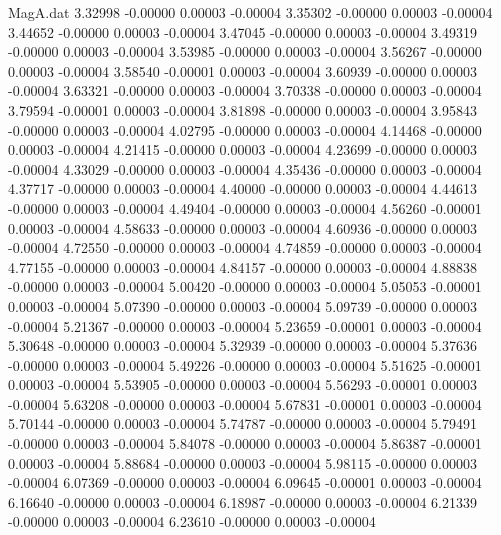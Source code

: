 \begin{filecontents}{MagA.dat}
   3.32998   -0.00000    0.00003   -0.00004
   3.35302   -0.00000    0.00003   -0.00004
   3.44652   -0.00000    0.00003   -0.00004
   3.47045   -0.00000    0.00003   -0.00004
   3.49319   -0.00000    0.00003   -0.00004
   3.53985   -0.00000    0.00003   -0.00004
   3.56267   -0.00000    0.00003   -0.00004
   3.58540   -0.00001    0.00003   -0.00004
   3.60939   -0.00000    0.00003   -0.00004
   3.63321   -0.00000    0.00003   -0.00004
   3.70338   -0.00000    0.00003   -0.00004
   3.79594   -0.00001    0.00003   -0.00004
   3.81898   -0.00000    0.00003   -0.00004
   3.95843   -0.00000    0.00003   -0.00004
   4.02795   -0.00000    0.00003   -0.00004
   4.14468   -0.00000    0.00003   -0.00004
   4.21415   -0.00000    0.00003   -0.00004
   4.23699   -0.00000    0.00003   -0.00004
   4.33029   -0.00000    0.00003   -0.00004
   4.35436   -0.00000    0.00003   -0.00004
   4.37717   -0.00000    0.00003   -0.00004
   4.40000   -0.00000    0.00003   -0.00004
   4.44613   -0.00000    0.00003   -0.00004
   4.49404   -0.00000    0.00003   -0.00004
   4.56260   -0.00001    0.00003   -0.00004
   4.58633   -0.00000    0.00003   -0.00004
   4.60936   -0.00000    0.00003   -0.00004
   4.72550   -0.00000    0.00003   -0.00004
   4.74859   -0.00000    0.00003   -0.00004
   4.77155   -0.00000    0.00003   -0.00004
   4.84157   -0.00000    0.00003   -0.00004
   4.88838   -0.00000    0.00003   -0.00004
   5.00420   -0.00000    0.00003   -0.00004
   5.05053   -0.00001    0.00003   -0.00004
   5.07390   -0.00000    0.00003   -0.00004
   5.09739   -0.00000    0.00003   -0.00004
   5.21367   -0.00000    0.00003   -0.00004
   5.23659   -0.00001    0.00003   -0.00004
   5.30648   -0.00000    0.00003   -0.00004
   5.32939   -0.00000    0.00003   -0.00004
   5.37636   -0.00000    0.00003   -0.00004
   5.49226   -0.00000    0.00003   -0.00004
   5.51625   -0.00001    0.00003   -0.00004
   5.53905   -0.00000    0.00003   -0.00004
   5.56293   -0.00001    0.00003   -0.00004
   5.63208   -0.00000    0.00003   -0.00004
   5.67831   -0.00001    0.00003   -0.00004
   5.70144   -0.00000    0.00003   -0.00004
   5.74787   -0.00000    0.00003   -0.00004
   5.79491   -0.00000    0.00003   -0.00004
   5.84078   -0.00000    0.00003   -0.00004
   5.86387   -0.00001    0.00003   -0.00004
   5.88684   -0.00000    0.00003   -0.00004
   5.98115   -0.00000    0.00003   -0.00004
   6.07369   -0.00000    0.00003   -0.00004
   6.09645   -0.00001    0.00003   -0.00004
   6.16640   -0.00000    0.00003   -0.00004
   6.18987   -0.00000    0.00003   -0.00004
   6.21339   -0.00000    0.00003   -0.00004
   6.23610   -0.00000    0.00003   -0.00004

\end{filecontents}

